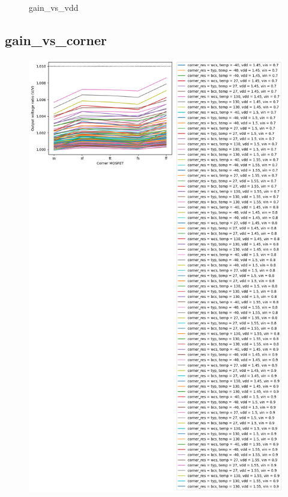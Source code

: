 \documentclass[
  a4paper,
  DIV=11,
  numbers=noendperiod]{scrartcl}
\begin{document}
\begin{tcolorbox}
\begin{figure}[H]
{}

\caption{gain\_vs\_vdd}

\end{figure}%

\subsection*{gain\_vs\_corner}\label{gain_vs_corner-1}

\begin{figure}[H]

{\centering \includegraphics{./cace/_docs/ota-improved/schematic/gain_vs_corner.png}

}
\end{figure}
\end{tcolorbox}
\end{document}
